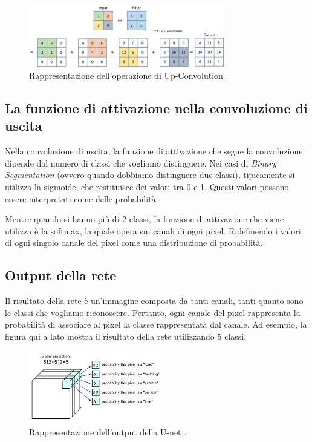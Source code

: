 \begin{figure}[H]
    \centering
    \includegraphics[width=0.76\textwidth]{Immagini/Generiche/up_conv.png}
    \caption{Rappresentazione dell'operazione di Up-Convolution \cite{APSETTI_UNET}.}
    \label{fig:Up-Convolution}
\end{figure}

\subsection{La funzione di attivazione nella convoluzione di uscita}
Nella convoluzione di uscita, la funzione di attivazione che segue la convoluzione dipende dal 
numero di classi che vogliamo distinguere.
Nei casi di \textit{Binary Segmentation} (ovvero quando dobbiamo distinguere due classi), 
tipicamente si utilizza la sigmoide, che restituisce dei valori tra 0 e 1.
Questi valori possono essere interpretati come delle probabilità. 

Mentre quando si hanno più di 2 classi, la funzione di attivazione che viene utilizza 
è la softmax, la quale opera sui canali di ogni pixel. Ridefinendo i valori di ogni singolo
canale del pixel come una distribuzione di probabilità.


\subsection{Output della rete}
\begin{multicols}{2}
    {Il risultato della rete è un'immagine composta da tanti canali, tanti 
    quanto sono le classi che vogliamo riconoscere.
    Pertanto, ogni canale del pixel rappresenta la probabilità di 
    associare al pixel la classe 
    rappresentata dal canale.
    Ad esempio, la figura qui a lato mostra il risultato della rete utilizzando 5 classi.}
    {
        \begin{figure}[H]
            \centering
            \includegraphics[width=0.52\textwidth]{Immagini/Generiche/softmax_UNET.png}
            \caption{Rappresentazione dell'output della U-net \cite{Imagesegmentation_pulapakura}.}
            \label{fig:UNET_OUTPUT}
        \end{figure}
    }
\end{multicols}






